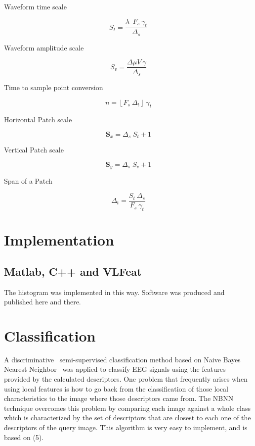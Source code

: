 Waveform time scale

\begin{equation}
S_t = \frac{ \lambda \;  \  F_s \ \gamma_t }{\Delta_s}
\label{eq:mapping2}
\end{equation}

Waveform amplitude scale

\begin{equation}
S_v= \frac{\Delta \mu V \ \gamma}{\Delta_s} 
\label{eq:mapping1}
\end{equation}

Time to sample point conversion

\begin{equation}
n = \left\lfloor F_s \ \Delta_t \right\rfloor \ \gamma_t
\label{eq:mapping1}
\end{equation}

Horizontal Patch scale

\begin{equation}
\mathbf{S}_x = \Delta_s \; S_t + 1
\label{eq:mapping2}
\end{equation}

Vertical Patch scale

\begin{equation}
\mathbf{S}_y = \Delta_s \; S_v + 1
\label{eq:mapping1}
\end{equation}

Span of a Patch

\begin{equation}
\Delta_t = \frac{S_t \ \Delta_s}{F_s \ \gamma_t} 
\label{eq:mapping1}
\end{equation}


\section{Implementation}

\subsection{Matlab, C++ and VLFeat}

The histogram was implemented in this way.  Software was produced and published here and there.


\section{Classification}

A discriminative~\cite{WolpawJonathanR2012} semi-supervised classification method based on Naive Bayes Nearest Neighbor~\cite{Boiman2008} was applied to classify EEG signals using the features provided by the calculated descriptors.
One problem that frequently arises when using local features is how to go back from the classification of those local characteristics to the image where those descriptors came from.
The NBNN technique overcomes this problem by comparing each image against a whole class which is characterized by the set of descriptors that are closest to each one of the descriptors of the query image. This algorithm is very easy to implement, and is based on (5).

